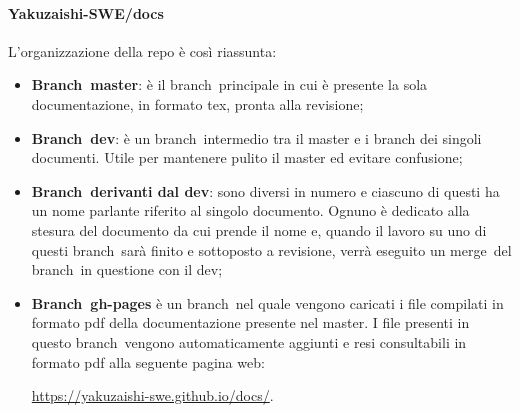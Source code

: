         \paragraph{Yakuzaishi-SWE/docs}
        L'organizzazione della repo è così riassunta:
        \begin{itemize}
            \item \textbf{Branch\glo\ master}: è il branch\glo\ principale in cui è presente la sola documentazione, in formato tex, pronta alla revisione;
            \item \textbf{Branch\glo\ dev}: è un branch\glo\ intermedio tra il master e i branch dei singoli documenti. Utile per mantenere pulito il master ed evitare confusione;
            \item \textbf{Branch\glo\ derivanti dal dev}: sono diversi in numero e ciascuno di questi ha un nome parlante riferito al singolo documento. Ognuno è dedicato alla stesura del documento da cui prende il nome e, quando il lavoro su uno di questi branch\glo\ sarà finito e sottoposto a revisione, verrà eseguito un merge\glo\ del branch\glo\ in questione con il dev;
            \item \textbf{Branch\glo\ gh-pages} è un branch\glo\ nel quale vengono caricati i file compilati in formato pdf della documentazione presente nel master. I file presenti in questo branch\glo\ vengono automaticamente aggiunti e resi consultabili in formato pdf alla seguente pagina web:
            \begin{center}
                \url{https://yakuzaishi-swe.github.io/docs/}.
            \end{center}
        \end{itemize}

